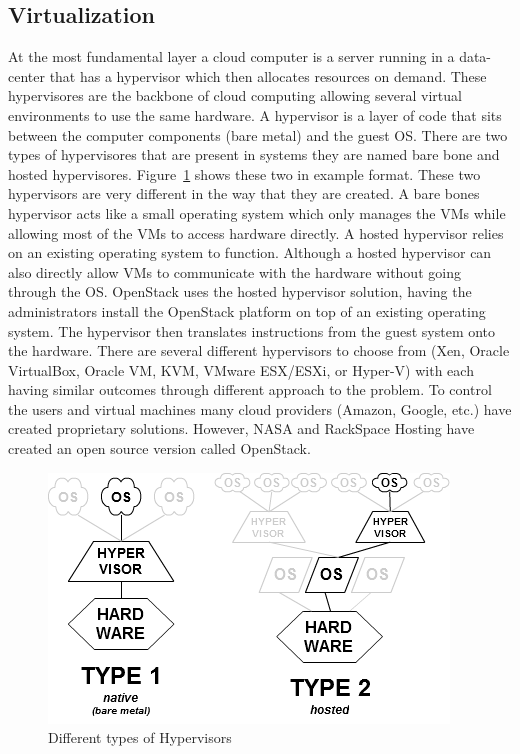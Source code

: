\documentclass[12pt]{article}
\begin{document}
\subsection{Virtualization}
At the most fundamental layer a cloud computer is a server running in a data-center that has a hypervisor which then allocates resources on demand. These hypervisores are the backbone of cloud computing allowing several virtual environments to use the same hardware. A hypervisor is a layer of code that sits between the computer components (bare metal) and the guest OS\@. There are two types of hypervisores that are present in systems they are named bare bone and hosted hypervisores. Figure~\ref{fig:Hypervisors} shows these two in example format. These two hypervisors are very different in the way that they are created.  A bare bones hypervisor acts like a small operating system which only manages the VMs while allowing most of the VMs to access hardware directly. A hosted hypervisor relies on an existing operating system to function. Although a hosted hypervisor can also directly allow VMs to communicate with the hardware without going through the OS\@. OpenStack uses the hosted hypervisor solution, having the administrators install the OpenStack platform on top of an existing operating system. The hypervisor then translates instructions from the guest system onto the hardware. There are several different hypervisors to choose from (Xen, Oracle VirtualBox, Oracle VM, KVM, VMware ESX/ESXi, or Hyper-V) with each having similar outcomes through different approach to the problem. To control the users and virtual machines many cloud providers (Amazon, Google, etc.) have created proprietary solutions. However, NASA and RackSpace Hosting \cite{OpenStack_Hist} have created an open source version called OpenStack.

\begin{figure}[H]
    \centering
    \includegraphics[scale=.8]{./pic/Hyperviseur.png}
    \caption{Different types of Hypervisors}
    \label{fig:Hypervisors}
\end{figure}
\end{document}
